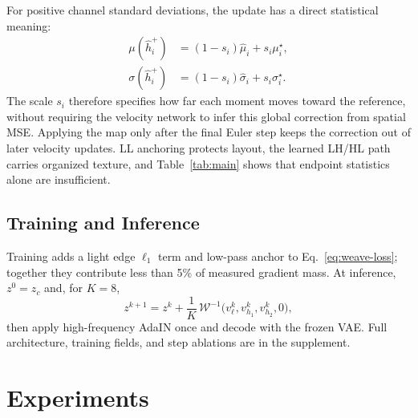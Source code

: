 \documentclass[letterpaper]{article}
\begin{document}
For positive channel standard deviations, the update has a direct statistical meaning:
\begin{equation}
\begin{aligned}
\mu(\hat h_i^+)&=(1-s_i)\hat\mu_i+s_i\mu_i^\star,\\
\sigma(\hat h_i^+)&=(1-s_i)\hat\sigma_i+s_i\sigma_i^\star.
\end{aligned}
\label{eq:moment-movement}
\end{equation}
The scale $s_i$ therefore specifies how far each moment moves toward the reference, without
requiring the velocity network to infer this global correction from spatial MSE. Applying
the map only after the final Euler step keeps the correction out of later velocity updates.
LL anchoring protects layout, the learned LH/HL path carries organized texture, and
Table~\ref{tab:main} shows that endpoint statistics alone are insufficient.


\subsection{Training and Inference}

Training adds a light edge $\ell_1$ term and low-pass anchor to Eq.~\ref{eq:weave-loss};
together they contribute less than 5\% of measured gradient mass. At inference, $z^0=z_c$
and, for $K=8$,
\begin{equation}
z^{k+1}=z^k+\frac{1}{K}\,\mathcal W^{-1}
\big(v_\ell^k,v_{h_1}^k,v_{h_2}^k,0\big),
\end{equation}
then apply high-frequency AdaIN once and decode with the frozen VAE. Full architecture,
training fields, and step ablations are in the supplement.



\section{Experiments}
\label{sec:exp}
\end{document}
